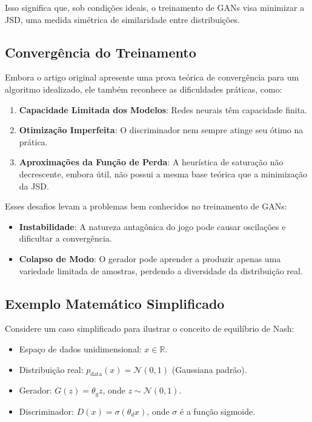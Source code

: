 \documentclass{tufte-handout}
\begin{document}
Isso significa que, sob condições ideais, o treinamento de GANs visa minimizar a JSD, uma medida simétrica de similaridade entre distribuições.
\subsection{Convergência do Treinamento}

Embora o artigo original apresente uma prova teórica de convergência para um algoritmo idealizado, ele também reconhece as dificuldades práticas, como:

\begin{enumerate}
    \item \textbf{Capacidade Limitada dos Modelos}: Redes neurais têm capacidade finita.
    \item \textbf{Otimização Imperfeita}: O discriminador nem sempre atinge seu ótimo na prática.
    \item \textbf{Aproximações da Função de Perda}: A heurística de saturação não decrescente, embora útil, não possui a mesma base teórica que a minimização da JSD.
\end{enumerate}

Esses desafios levam a problemas bem conhecidos no treinamento de GANs:

\begin{itemize}
    \item \textbf{Instabilidade}: A natureza antagônica do jogo pode causar oscilações e dificultar a convergência.
    \item \textbf{Colapso de Modo}: O gerador pode aprender a produzir apenas uma variedade limitada de amostras, perdendo a diversidade da distribuição real.
\end{itemize}

\subsection{Exemplo Matemático Simplificado}

Considere um caso simplificado para ilustrar o conceito de equilíbrio de Nash:

\begin{itemize}
    \item Espaço de dados unidimensional: $x \in \mathbb{R}$.
    \item Distribuição real: $p_{\text{data}}(x) = \mathcal{N}(0, 1)$ (Gaussiana padrão).
    \item Gerador: $G(z) = \theta_g z$, onde $z \sim \mathcal{N}(0, 1)$.
    \item Discriminador: $D(x) = \sigma(\theta_d x)$, onde $\sigma$ é a função sigmoide.
\end{itemize}
\end{document}
